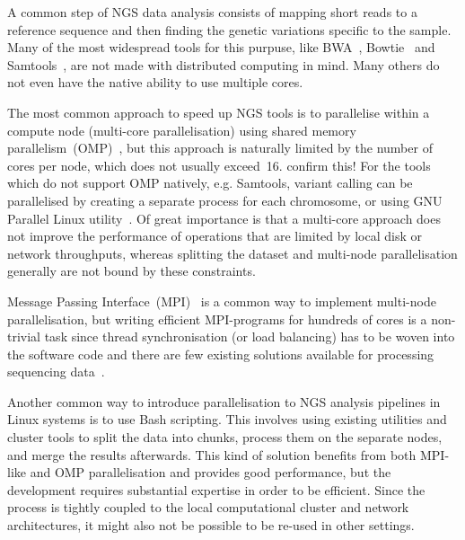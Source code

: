 \documentclass[11pt, oneside]{article}   	%
\newcommand{\COMMENT}[1]{{\color{red} #1 }}
\begin{document}
A common step of NGS data analysis consists of mapping short reads to a reference sequence and then finding the genetic variations specific to the sample.
Many of the most widespread tools for this purpuse, like BWA~\cite{bwa}, Bowtie~\cite{bowtie} and Samtools~\cite{samtools}, are not made with distributed computing in mind. Many others do not even have the native ability to use multiple cores. %


The most common approach to speed up NGS tools is to parallelise within a compute node (multi-core parallelisation) using shared memory parallelism~(OMP)~\cite{openmp}, but this approach is naturally limited by the number of cores per node, which does not usually exceed~16. \COMMENT{confirm this!} For the tools which do not support OMP natively, e.g. Samtools, variant calling can be parallelised by creating a separate process  for  each chromosome, or using GNU Parallel Linux utility~\cite{gnuparallel}.
Of great importance is that a multi-core approach does not improve the performance of operations that are limited by local disk or network throughputs, whereas splitting the dataset and multi-node parallelisation generally are not bound by these constraints.

Message Passing Interface~(MPI)~\cite{mpi1} is a common way to implement multi-node parallelisation, but writing efficient MPI-programs for hundreds of cores is a non-trivial task since thread synchronisation (or load balancing) has to be woven into the software code and there are few existing solutions available for processing sequencing data~\cite{pmap, erne, gnumap}.

Another common way to introduce parallelisation to NGS analysis pipelines in Linux systems is to use Bash scripting. This involves using existing utilities and cluster tools to split the data into chunks, process them on the separate nodes, and merge the results afterwards. This kind of solution benefits from both MPI-like and OMP parallelisation and provides good performance, but the development requires substantial expertise in order to be efficient. Since the process is tightly coupled to the local computational cluster and network architectures, it might also not be possible to be re-used in other settings.
\end{document}
